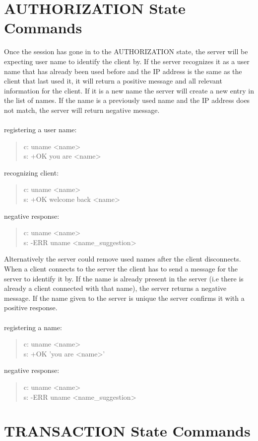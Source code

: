 \documentclass[a4paper,11pt]{article}
\begin{document}
\section{AUTHORIZATION State Commands}
Once the session has gone in to the AUTHORIZATION state, the server will be expecting user name to identify the client by. If the server recognizes it as a user name that has already been used before and the IP address is the same as the client that last used it, it will return a positive message and all relevant information for the client. If it is a new name the server will create a new entry in the list of names. If the name is a previously used name and the IP address does not match, the server will return negative message.\\\\
registering a user name:
\begin{quote}
  c: uname <name>\\
  s: +OK you are <name>
\end{quote}
\noindent
recognizing client:
\begin{quote}
  c: uname <name>\\
  s: +OK welcome back <name>
\end{quote}
\noindent
negative response:
\begin{quote}
  c: uname <name>\\
  s: -ERR uname <name\_suggestion>
\end{quote}


Alternatively the server could remove used names after the client disconnects. When a client connects to the server the client has to send a message for the server to identify it by. If the name is already present in the server (i.e there is already a client connected with that name), the server returns a negative message. If the name given to the server is unique the server confirms it with a positive response.\\\\
registering a name:

\begin{quote}
  c: uname <name>\\
  s: +OK 'you are <name>'
\end{quote}
\noindent
negative response:
\begin{quote}
  c: uname <name>\\
  s: -ERR uname <name\_suggestion>
\end{quote}


\clearpage
\section{TRANSACTION State Commands}
\end{document}

